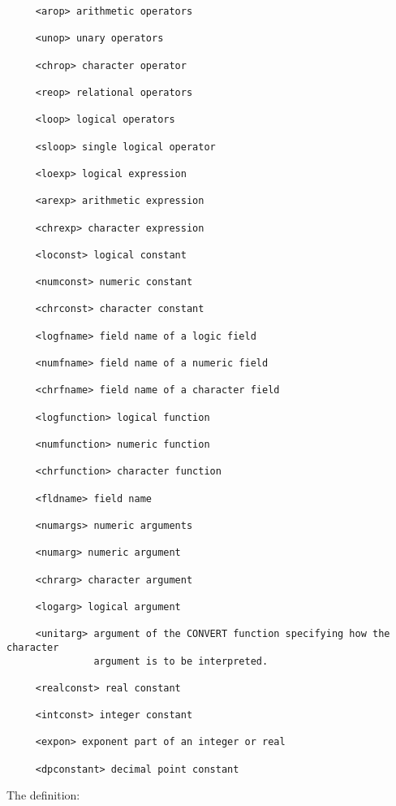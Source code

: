 \begin{small}
\begin{verbatim}
     <arop> arithmetic operators

     <unop> unary operators

     <chrop> character operator

     <reop> relational operators

     <loop> logical operators

     <sloop> single logical operator

     <loexp> logical expression

     <arexp> arithmetic expression

     <chrexp> character expression

     <loconst> logical constant

     <numconst> numeric constant

     <chrconst> character constant

     <logfname> field name of a logic field

     <numfname> field name of a numeric field

     <chrfname> field name of a character field

     <logfunction> logical function

     <numfunction> numeric function

     <chrfunction> character function

     <fldname> field name

     <numargs> numeric arguments

     <numarg> numeric argument

     <chrarg> character argument

     <logarg> logical argument

     <unitarg> argument of the CONVERT function specifying how the character
               argument is to be interpreted.

     <realconst> real constant

     <intconst> integer constant

     <expon> exponent part of an integer or real

     <dpconstant> decimal point constant
\end{verbatim}
\end{small}

The definition:

